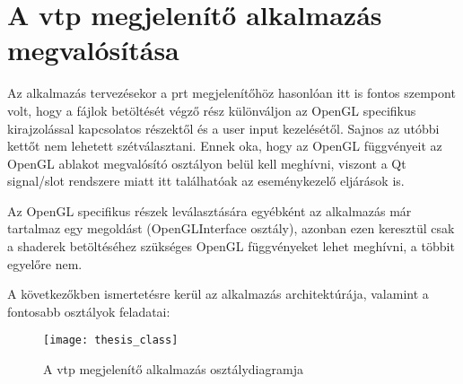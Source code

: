 \section{A vtp megjelenítő alkalmazás megvalósítása}

Az alkalmazás tervezésekor a prt megjelenítőhöz hasonlóan 
itt is fontos szempont volt, 
hogy a fájlok betöltését végző rész különváljon 
az OpenGL specifikus kirajzolással kapcsolatos részektől 
és a user input kezelésétől. 
Sajnos az utóbbi kettőt nem lehetett szétválasztani. 
Ennek oka, hogy az OpenGL függvényeit 
az OpenGL ablakot megvalósító osztályon belül kell meghívni, 
viszont a Qt signal/slot rendszere miatt itt találhatóak 
az eseménykezelő eljárások is. 

Az OpenGL specifikus részek leválasztására egyébként 
az alkalmazás már tartalmaz egy megoldást ({\ttfamily OpenGLInterface} osztály), 
azonban ezen keresztül csak 
a shaderek betöltéséhez szükséges OpenGL függvényeket lehet meghívni, 
a többit egyelőre nem.

A következőkben ismertetésre kerül az alkalmazás architektúrája, 
valamint a fontosabb osztályok feladatai:

\begin{figure}[h]
\centering
\texttt{[image: thesis\_class]}
\caption{A vtp megjelenítő alkalmazás osztálydiagramja}
\label{fig:x thesis_class}
\end{figure}

